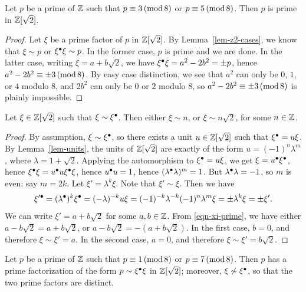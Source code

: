 \begin{lemma}\label{lem-3-5}
  Let $p$ be a prime of $\mathbb{Z}$ such that $p\equiv 3\,(\mathop{{\rm mod}}8)$ or $p\equiv
  5\,(\mathop{{\rm mod}}8)$. Then $p$ is prime in $\mathbb{Z}[\sqrt2]$.
\end{lemma}

\begin{proof}
  Let $\xi$ be a prime factor of $p$ in $\mathbb{Z}[\sqrt2]$. By
  Lemma~\ref{lem-z2-cases}, we know that $\xi\sim p$ or
  $\xi^{\bullet}\xi\sim p$. In the former case, $p$ is prime and we are
  done. In the latter case, writing $\xi=a+b\sqrt2$, we have
  $\xi^{\bullet}\xi = a^2-2b^2 =\pm p$, hence $a^2-2b^2\equiv\pm3\,(\mathop{{\rm mod}}8)$.
  By easy case distinction, we see that $a^2$ can only be $0$, $1$, or
  $4$ modulo $8$, and $2b^2$ can only be $0$ or $2$ modulo $8$, so
  $a^2-2b^2\equiv\pm3\,(\mathop{{\rm mod}}8)$ is plainly impossible.
\end{proof}

\begin{lemma}\label{lem-associate-primes}
  Let $\xi\in\mathbb{Z}[\sqrt2]$ such that $\xi\sim\xi^{\bullet}$. Then either
  $\xi\sim n$, or $\xi\sim n\sqrt{2}$, for some $n\in\mathbb{Z}$.
\end{lemma}

\begin{proof}
  By assumption, $\xi\sim\xi^{\bullet}$, so there exists a unit
  $u\in\mathbb{Z}[\sqrt2]$ such that $\xi^{\bullet}=u\xi$. By Lemma~\ref{lem-units}, the 
  units of $\mathbb{Z}[\sqrt2]$ are exactly of the form $u=(-1)^n\lambda^m$, where
  $\lambda=1+\sqrt2$. Applying the automorphism to $\xi^{\bullet}=u\xi$, we get 
  $\xi=u^{\bullet}\xi^{\bullet}$, hence $\xi^{\bullet}\xi = u^{\bullet} u\xi^{\bullet}\xi$, hence 
  $u^{\bullet} u=1$, hence $(\lambda^{\bullet}\lambda)^m = 1$. But $\lambda^{\bullet}\lambda=-1$, 
  so $m$ is even; say $m=2k$. Let $\xi' = \lambda^k\xi$. Note that
  $\xi'\sim\xi$. Then we have
  \begin{equation}\label{eqn-xi-prime}
    \xi'^\bullet = (\lambda^{\bullet})^k\xi^{\bullet} = (-\lambda)^{-k} u\xi
    = (-1)^{-k}\lambda^{-k}(-1)^n\lambda^{m}\xi = \pm\lambda^k\xi = \pm \xi'.
  \end{equation}
  We can write $\xi' = a+b\sqrt2$ for some $a,b\in\mathbb{Z}$. From
  {\eqref{eqn-xi-prime}}, we have either $a-b\sqrt 2 = a+b\sqrt 2$, or
  $a-b\sqrt 2 = -(a+b\sqrt 2)$. In the first case, $b=0$, and therefore
  $\xi\sim\xi'= a$. In the second case, $a=0$, and therefore
  $\xi\sim\xi'= b\sqrt 2$.
\end{proof}

\begin{lemma}\label{lem-1-7}
  Let $p$ be a prime of $\mathbb{Z}$ such that $p\equiv 1\,(\mathop{{\rm mod}}8)$ or $p\equiv
  7\,(\mathop{{\rm mod}}8)$. Then $p$ has a prime factorization of the form $p\sim
  \xi^{\bullet}\xi$ in $\mathbb{Z}[\sqrt2]$; moreover, $\xi\not\sim\xi^{\bullet}$, so that
  the two prime factors are distinct.
\end{lemma}

